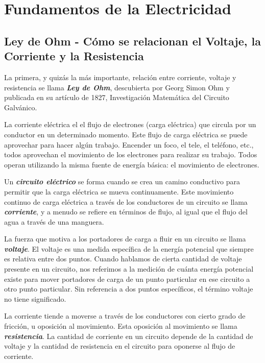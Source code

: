 \documentclass[output=paper, 
colorlinks,
citecolor=brown,
newtxmath
]{langscibook}
\begin{document}
\section{Fundamentos de la Electricidad}




\subsection{Ley de Ohm - Cómo se relacionan el Voltaje, la Corriente y la Resistencia}

La primera, y quizás la más importante, relación entre corriente, voltaje y resistencia se llama \textit{\textbf{Ley de Ohm}}, descubierta por Georg Simon Ohm y publicada en su artículo de 1827, Investigación Matemática del Circuito Galvánico.

La corriente eléctrica el el flujo de electrones (carga eléctrica) que circula por un conductor en un determinado momento. Este flujo de carga eléctrica se puede aprovechar para hacer algún trabajo. Encender un foco, el tele, el teléfono, etc., todos aprovechan el movimiento de los electrones para realizar su trabajo. Todos operan utilizando la misma fuente de energía básica: el movimiento de electrones.

Un \textit{\textbf{circuito eléctrico}} se forma cuando se crea un camino conductivo para permitir que la carga eléctrica se mueva continuamente. Este movimiento continuo de carga eléctrica a través de los conductores de un circuito se llama \textit{\textbf{corriente}}, y a menudo se refiere en términos de flujo, al igual que el flujo del agua a través de una manguera.

La fuerza que motiva a los portadores de carga a fluir en un circuito se llama \textit{\textbf{voltaje}}. El voltaje es una medida específica de la energía potencial que siempre es relativa entre dos puntos. Cuando hablamos de cierta cantidad de voltaje presente en un circuito, nos referimos a la medición de cuánta energía potencial existe para mover portadores de carga de un punto particular en ese circuito a otro punto particular. Sin referencia a dos puntos específicos, el término voltaje no tiene significado.

La corriente tiende a moverse a través de los conductores con cierto grado de fricción, u oposición al movimiento. Esta oposición al movimiento se llama \textit{\textbf{resistencia}}. La cantidad de corriente en un circuito depende de la cantidad de voltaje y la cantidad de resistencia en el circuito para oponerse al flujo de corriente.
\end{document}
